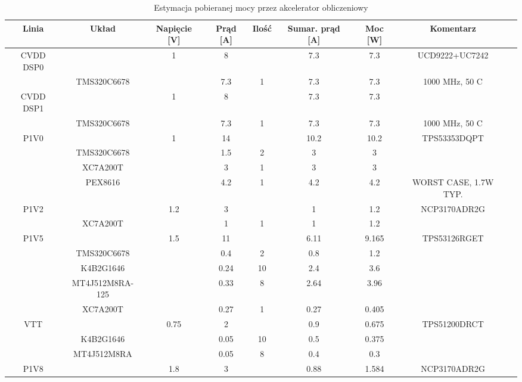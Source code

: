   \begin{sidewaystable}

  \centering
	\caption{Estymacja pobieranej mocy przez akcelerator obliczeniowy}
    \begin{tabular}{| c| c| c | c | c | c | c | c | c}
    \hline
    \textbf{Linia} & \textbf{Układ} & \textbf{Napięcie [V]} & \textbf{Prąd [A]} & \textbf{Ilość}  & \textbf{Sumar. prąd} [A] &   \textbf{Moc [W]} &  \textbf{Komentarz}\\
    \hline
    \hline

    CVDD DSP0  	& 				& 	1 	&	8	& 		& 	7.3 	& 	7.3 	& 	UCD9222+UC7242		\\
         \hline
    			& 	TMS320C6678 	& 		& 	7.3	&	1	& 	7.3 	& 	7.3 	& 	1000 MHz, 50 C		\\
     \hline
    CVDD DSP1  	& 				& 	1 	&	8	& 		& 	7.3 	& 	7.3	& 					\\
         \hline
    		   	& 	TMS320C6678 	& 		& 	7.3 	&	1	& 	7.3 	& 	7.3 	& 	1000 MHz, 50 C 		\\
     \hline
    P1V0		& 				&	1	&	14	&		& 	10.2	& 	10.2	& 	TPS53353DQPT		\\
     \hline
			& 	TMS320C6678	&		& 	1.5 	&	2 	&	3	&	3	&					\\
			& 	XC7A200T 		&		& 	3 	&	1	&	3	&	3	&					\\
			& 	PEX8616		&		& 	4.2 	&	1 	&	4.2	&	4.2	&	WORST CASE, 1.7W TYP.	\\
     \hline
    P1V2		& 				&	1.2	&	3	&		& 	1	& 	1.2	& 	NCP3170ADR2G		\\
     \hline
			& 	XC7A200T 		&		& 	1 	&	1	&	1	&	1.2	&					\\
     \hline
    P1V5		& 				&	1.5	&	11	&		& 	6.11	& 	9.165	& 	TPS53126RGET		\\
     \hline
			& 	TMS320C6678	&		& 	0.4 	&	2 	&	0.8	&	1.2	&					\\
			& 	K4B2G1646		&		& 	0.24 	&	10 	&	2.4	&	3.6	&					\\
			& 	MT4J512M8RA-125	&		& 	0.33 	&	8 	&	2.64	&	3.96	&					\\
			& 	XC7A200T 		&		& 	0.27	&	1 	&	0.27	&	0.405	&					\\
\hline
     VTT		&				&     0.75	&	2	&		&	0.9	&	0.675	&	TPS51200DRCT		\\
     \hline
			&	K4B2G1646		&    		&	0.05	&	10	&	0.5	&	0.375	&					\\
			&	MT4J512M8RA	&    		&	0.05	&	8	&	0.4	&	0.3	&					\\
     \hline
    P1V8		& 				&	1.8	&	3	&		& 	0.88	& 	1.584	& 	NCP3170ADR2G		\\

\end{tabular}
\end{sidewaystable}
